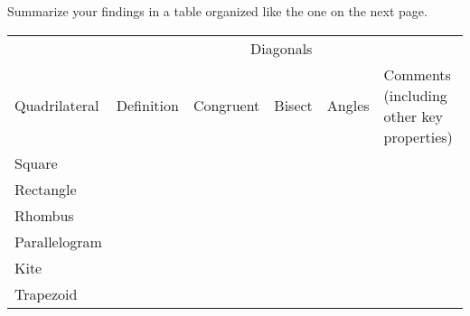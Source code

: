 \begin{prob}
Summarize your findings in a table organized like the one on the next page.  
\newpage 

\renewcommand\arraystretch{4}
\renewcommand\tabcolsep{12pt}
\begin{table}[h]
\begin{tabular}{|l|p{6cm}|c|c|c|p{8cm}|}
\hline
 &   & \multicolumn{3}{c|}{Diagonals} &  \\  %
Quadrilateral & Definition  & \begin{sideways}Congruent\end{sideways} & 
\begin{sideways}Bisect\end{sideways} & \begin{sideways}Angles\end{sideways} & Comments (including other key properties) \\ \hline\hline
Square           &            &   &  &         &                  \\ \hline
Rectangle       &           &   &  &         &                  \\ \hline
Rhombus        &           &   &  &         &                  \\ \hline
Parallelogram &           &   &  &         &                  \\ \hline
Kite                &           &   &  &          &                  \\ \hline
Trapezoid       &           &   &  &         &                  \\ \hline
\end{tabular}
\end{table}

\end{prob}




